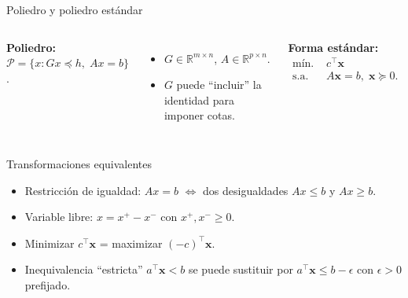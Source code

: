 \documentclass[10pt,aspectratio=169]{beamer}
\newcommand{\R}{\mathbb{R}}
\newcommand{\x}{\mathbf{x}}
\newcommand{\0}{\mathbf{0}}
\begin{document}
\begin{frame}{Poliedro y poliedro estándar}
  \begin{columns}
      \textbf{Poliedro:}
      $\mathcal{P}=\{x:Gx\preceq h,\;Ax=b\}$.
      \begin{itemize}
        \item $G\in\R^{m\times n}$, $A\in\R^{p\times n}$.
        \item $G$ puede ``incluir'' la identidad para imponer cotas.
      \end{itemize}
      \textbf{Forma estándar:}
      \begin{align*}
        \text{mín. } & c^\top\x \\
        \text{s.a. }  & A\x=b,\;\x\succeq 0.
      \end{align*}
      \centering
  \end{columns}
\end{frame}

\begin{frame}{Transformaciones equivalentes}
  \begin{itemize}
    \item Restricción de igualdad: $Ax=b$ $\Leftrightarrow$ dos desigualdades $Ax\le b$ y $Ax\ge b$.
    \item Variable libre: $x=x^+-x^-$ con $x^+,x^-\ge 0$.
    \item Minimizar $c^\top\x$ = maximizar $(-c)^\top\x$.
    \item Inequivalencia ``estricta'' $a^\top\x<b$ se puede sustituir por
      $a^\top\x\le b-\epsilon$ con $\epsilon>0$ prefijado.
  \end{itemize}
\end{frame}
\end{document}
